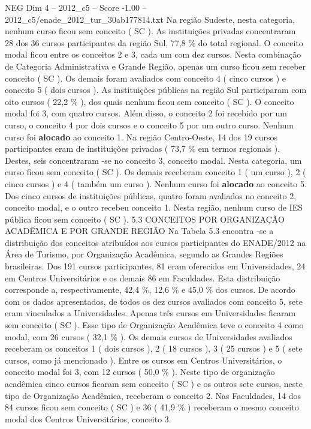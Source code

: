 \begin{textsample}{NEG Dim 4 – 2012\_c5 – Score -1.00 – 2012\_c5/enade\_2012\_tur\_30ab177814.txt}
Na região Sudeste, nesta categoria, nenhum curso ficou sem conceito ( SC ).
As instituições privadas concentraram 28 dos 36 cursos participantes da região Sul, 77,8 \% do total regional.
O conceito modal ficou entre os conceitos 2 e 3, cada um com dez cursos.
Nesta combinação de Categoria Administrativa e Grande Região, apenas um curso ficou sem receber conceito ( SC ).
Os demais foram avaliados com conceito 4 ( cinco cursos ) e conceito 5 ( dois cursos ).
As instituições públicas na região Sul participaram com oito cursos ( 22,2 \% ), dos quais nenhum ficou sem conceito ( SC ).
O conceito modal foi 3, com quatro cursos.
Além disso, o conceito 2 foi recebido por um curso, o conceito 4 por dois cursos e o conceito 5 por um outro curso.
Nenhum curso foi \textbf{alocado} ao conceito 1.
Na região Centro-Oeste, 14 dos 19 cursos participantes eram de instituições privadas ( 73,7 \% em termos regionais ).
Destes, seis concentraram -se no conceito 3, conceito modal.
Nesta categoria, um curso ficou sem conceito ( SC ).
Os demais receberam conceito 1 ( um curso ), 2 ( cinco cursos ) e 4 ( também um curso ).
Nenhum curso foi \textbf{alocado} ao conceito 5.
Dos cinco cursos de instituições públicas, quatro foram avaliados no conceito 2, conceito modal, e o outro recebeu conceito 1.
Nesta região, nenhum curso de IES pública ficou sem conceito ( SC ). 5.3 CONCEITOS POR ORGANIZAÇÃO ACADÊMICA E POR GRANDE REGIÃO Na Tabela 5.3 encontra -se a distribuição dos conceitos atribuídos aos cursos participantes do ENADE/2012 na Área de Turismo, por Organização Acadêmica, segundo as Grandes Regiões brasileiras.
Dos 191 cursos participantes, 81 eram oferecidos em Universidades, 24 em Centros Universitários e os demais 86 em Faculdades.
Esta distribuição corresponde a, respectivamente, 42,4 \%, 12,6 \% e 45,0 \% dos cursos.
De acordo com os dados apresentados, de todos os dez cursos avaliados com conceito 5, sete eram vinculados a Universidades.
Apenas três cursos em Universidades ficaram sem conceito ( SC ).
Esse tipo de Organização Acadêmica teve o conceito 4 como modal, com 26 cursos ( 32,1 \% ).
Os demais cursos de Universidades avaliados receberam os conceitos 1 ( dois cursos ), 2 ( 18 cursos ), 3 ( 25 cursos ) e 5 ( sete cursos, como já mencionado ).
Entre os cursos em Centros Universitários, o conceito modal foi 3, com 12 cursos ( 50,0 \% ).
Neste tipo de organização acadêmica cinco cursos ficaram sem conceito ( SC ) e os outros sete cursos, neste tipo de Organização Acadêmica, receberam o conceito 2.
Nas Faculdades, 14 dos 84 cursos ficou sem conceito ( SC ) e 36 ( 41,9 \% ) receberam o mesmo conceito modal dos Centros Universitários, conceito 3.

\end{textsample}
